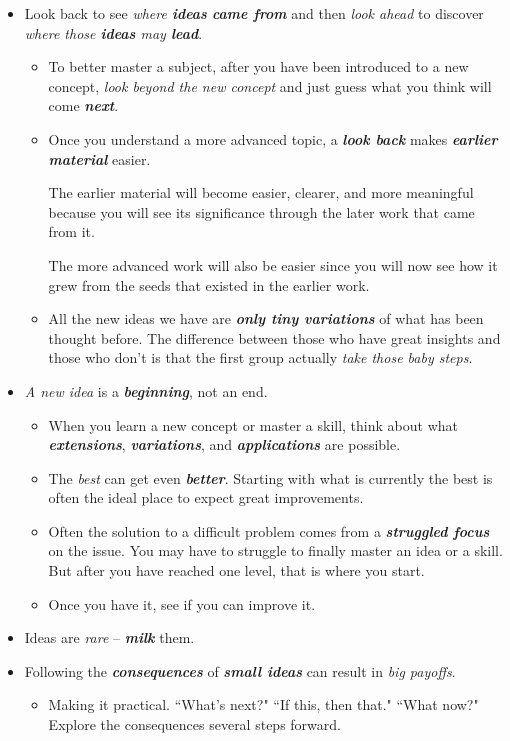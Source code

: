 \documentclass[11pt]{article}
\begin{document}
\begin{itemize}
\item Look back to see \emph{where \textbf{ideas} \textbf{came from}} and then \emph{look ahead} to discover \emph{where those \textbf{ideas} may \textbf{lead}}. 
\begin{itemize}
\item To better master a subject, after you have been introduced to a new concept, \emph{look beyond the new concept} and just guess what you think will come \emph{\textbf{next}}.

\item Once you understand a more advanced topic, a \emph{\textbf{look back}} makes \emph{\textbf{earlier material}} easier.

The earlier material will become easier, clearer, and more meaningful because you will
see its significance through the later work that came from it.

The more advanced work will also be easier since you will now see how it grew from
the seeds that existed in the earlier work.

\item All the new ideas we have are \emph{\textbf{only tiny variations}} of what has been thought before. The difference between those who have great insights and those who don’t is that the first group actually \emph{take those baby steps}.
\end{itemize}

\item \emph{A new idea} is a \emph{\textbf{beginning}}, not an end. 
\begin{itemize}
\item When you learn a new concept or master a skill, think about what \emph{\textbf{extensions}}, \emph{\textbf{variations}}, and \emph{\textbf{applications}} are possible.

\item The \emph{best} can get even \emph{\textbf{better}}. Starting with what is currently the best is often the ideal place to expect great improvements.

\item Often the solution to a difficult problem comes from a \emph{\textbf{struggled focus}} on the issue. You may have to struggle to finally
master an idea or a skill.  But after you have reached one level, that is where you start.

\item Once you have it, see if you can improve it.
\end{itemize}
\item Ideas are \emph{rare} -- \emph{\textbf{milk}} them. 
\item Following the \emph{\textbf{consequences}} of \emph{\textbf{small ideas}} can result in \emph{big payoffs}.
\begin{itemize}
\item Making it practical. ``What’s next?"  ``If this, then that." ``What now?" Explore the consequences several steps forward.


\end{itemize}
\end{itemize}
\end{document}
